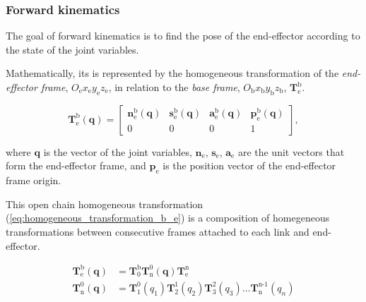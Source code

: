 \subsubsection{Forward kinematics}
\label{subsubsec:forward_kinematics}

The goal of forward kinematics is to find the pose of the end-effector according to the state of the joint variables.

Mathematically, its is represented by the homogeneous transformation of the \emph{end-effector frame}, $O_{\text{e}}x_{\text{e}}y_{\text{e}}z_{\text{e}}$, in relation to the \emph{base frame}, $O_{\text{b}}x_{\text{b}}y_{\text{b}}z_{\text{b}}$, $\boldsymbol{T}^{\text{b}}_{\text{e}}$. 

\begin{equation}
    \boldsymbol{T}^{\text{b}}_{\text{e}}(\boldsymbol{q}) =
    \begin{bmatrix}
    \boldsymbol{n}^{\text{b}}_{\text{e}}(\boldsymbol{q}) & \boldsymbol{s}^{\text{b}}_{\text{e}}(\boldsymbol{q}) & \boldsymbol{a}^{\text{b}}_{\text{e}}(\boldsymbol{q}) & \boldsymbol{p}^{\text{b}}_{\text{e}}(\boldsymbol{q})\\
    0 & 0 & 0 & 1
    \end{bmatrix},
\end{equation}

where $\boldsymbol{q}$ is the vector of the joint variables, $\boldsymbol{n}_{\text{e}}$, $\boldsymbol{s}_{\text{e}}$, $\boldsymbol{a}_{\text{e}}$ are the unit vectors that form the end-effector frame, and $\boldsymbol{p}_{\text{e}}$ is the position vector of the end-effector frame origin.

This open chain homogeneous transformation (\ref{eq:homogeneous_transformation_b_e}) is a composition of homegeneous transformations between consecutive frames attached to each link and end-effector.

\begin{align}
    \label{eq:homogeneous_transformation_b_e}
    \boldsymbol{T}^{\text{b}}_{\text{e}}(\boldsymbol{q}) &= \boldsymbol{T}^{\text{b}}_{\text{0}}\boldsymbol{T}^{\text{0}}_{\text{n}}(\boldsymbol{q})\boldsymbol{T}^{\text{n}}_{\text{e}} \\
    \boldsymbol{T}^{\text{0}}_{\text{n}}(\boldsymbol{q}) &= \boldsymbol{T}^{\text{0}}_{\text{1}}(q_1)\boldsymbol{T}^{\text{1}}_{\text{2}}(q_2)\boldsymbol{T}^{\text{2}}_{\text{3}}(q_3)\ldots\boldsymbol{T}^{\text{n-1}}_{\text{n}}(q_n)
\end{align}

